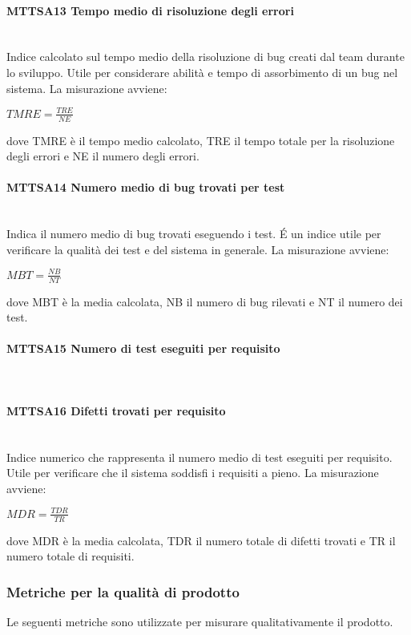 \paragraph{MTTSA13 Tempo medio di risoluzione degli errori}\-\\
Indice calcolato sul tempo medio della risoluzione di bug creati dal team durante lo sviluppo. Utile per considerare abilità e tempo di assorbimento di un bug nel sistema. La misurazione avviene:
\begin{center}
	\item $TMRE = \frac{TRE}{NE}$
\end{center}
dove TMRE è il tempo medio calcolato, TRE il tempo totale per la risoluzione degli errori e NE il numero degli errori.

\paragraph{MTTSA14 Numero medio di bug trovati per test}\-\\
Indica il numero medio di bug trovati eseguendo i test. \'E un indice utile per verificare la qualità dei test e del sistema in generale. La misurazione avviene:
\begin{center}
	\item $MBT = \frac{NB}{NT}$
\end{center}
dove MBT è la media calcolata, NB il numero di bug rilevati e NT il numero dei test.

\paragraph{MTTSA15 Numero di test eseguiti per requisito}\-\\

\paragraph{MTTSA16 Difetti trovati per requisito}\-\\
Indice numerico che rappresenta il numero medio di test eseguiti per requisito. Utile per verificare che il sistema soddisfi i requisiti a pieno. La misurazione avviene:
\begin{center}
	\item $MDR = \frac{TDR}{TR}$
\end{center}
dove MDR è la media calcolata, TDR il numero totale di difetti trovati e TR il numero totale di requisiti.

\subsubsection{Metriche per la qualità di prodotto}
Le seguenti metriche sono utilizzate per misurare qualitativamente il prodotto.

